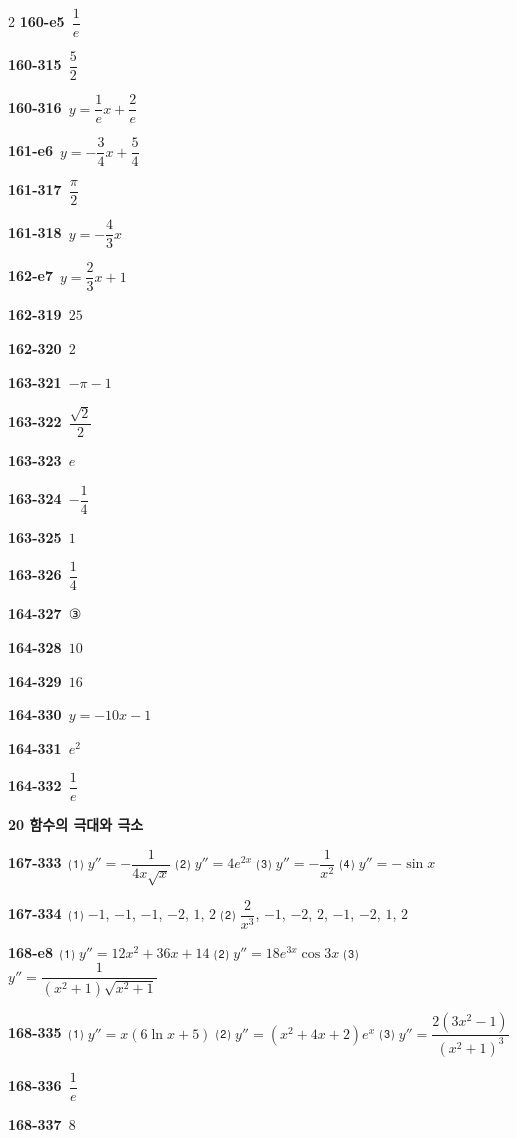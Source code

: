 \documentclass[10pt,a4paper]{article}
\begin{document}
\begin{multicols}{2}
\noindent\textbf{160-e5}\ $\dfrac{1}{e}$\par
\noindent\textbf{160-315}\ $\dfrac{5}{2}$\par
\noindent\textbf{160-316}\ $y=\dfrac{1}{e}x+\dfrac{2}{e}$\par
\noindent\textbf{161-e6}\ $y=-\dfrac{3}{4}x+\dfrac{5}{4}$\par
\noindent\textbf{161-317}\ $\dfrac{\pi}{2}$\par
\noindent\textbf{161-318}\ $y=-\dfrac{4}{3}x$\par
\noindent\textbf{162-e7}\ $y=\dfrac{2}{3}x+1$\par
\noindent\textbf{162-319}\ $25$\par
\noindent\textbf{162-320}\ $2$\par
\noindent\textbf{163-321}\ $-\pi-1$\par
\noindent\textbf{163-322}\ $\dfrac{\sqrt{2}}{2}$\par
\noindent\textbf{163-323}\ $e$\par
\noindent\textbf{163-324}\ $-\dfrac{1}{4}$\par
\noindent\textbf{163-325}\ $1$\par
\noindent\textbf{163-326}\ $\dfrac{1}{4}$\par
\noindent\textbf{164-327}\ ③\par
\noindent\textbf{164-328}\ $10$\par
\noindent\textbf{164-329}\ $16$\par
\noindent\textbf{164-330}\ $y=-10x-1$\par
\noindent\textbf{164-331}\ $e^2$\par
\noindent\textbf{164-332}\ $\dfrac{1}{e}$\par
\noindent\textbf{20 함수의 극대와 극소}\par\smallskip
\noindent\textbf{167-333}\ ⑴ $y''=-\dfrac{1}{4x\sqrt{x}}$ ⑵ $y''=4e^{2x}$ ⑶ $y''=-\dfrac{1}{x^2}$ ⑷ $y''=-\sin x$\par
\noindent\textbf{167-334}\ ⑴ $-1$, $-1$, $-1$, $-2$, $1$, $2$ ⑵ $\dfrac{2}{x^3}$, $-1$, $-2$, $2$, $-1$, $-2$, $1$, $2$\par
\noindent\textbf{168-e8}\ ⑴ $y''=12x^2+36x+14$ ⑵ $y''=18e^{3x}\cos 3x$ ⑶ $y''=\dfrac{1}{(x^2+1)\sqrt{x^2+1}}$\par
\noindent\textbf{168-335}\ ⑴ $y''=x(6\ln x+5)$ ⑵ $y''=(x^2+4x+2)e^x$ ⑶ $y''=\dfrac{2(3x^2-1)}{(x^2+1)^3}$\par
\noindent\textbf{168-336}\ $\dfrac{1}{e}$\par
\noindent\textbf{168-337}\ $8$\par

\end{multicols}
\end{document}

